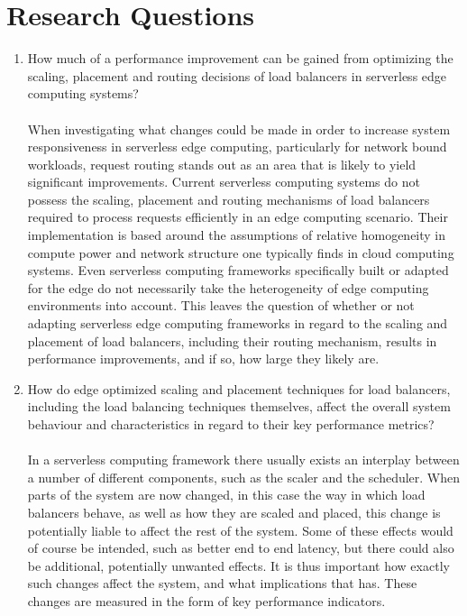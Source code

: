 \section{Research Questions}

\begin{enumerate}
    \item How much of a performance improvement can be gained from optimizing the scaling, placement and routing decisions of load balancers in serverless edge computing systems?\\\\
    When investigating what changes could be made in order to increase system responsiveness in serverless edge computing, particularly for network bound workloads, request routing stands out as an area that is likely to yield significant improvements. Current serverless computing systems do not possess the scaling, placement and routing mechanisms of load balancers required to process requests efficiently in an edge computing scenario. Their implementation is based around the assumptions of relative homogeneity in compute power and network structure one typically finds in cloud computing systems. Even serverless computing frameworks specifically built or adapted for the edge do not necessarily take the heterogeneity of edge computing environments into account. %
    This leaves the question of whether or not adapting serverless edge computing frameworks in regard to the scaling and placement of load balancers, including their routing mechanism, results in performance improvements, and if so, how large they likely are.
    
    \item How do edge optimized scaling and placement techniques for load balancers, including the load balancing techniques themselves, affect the overall system behaviour and characteristics in regard to their key performance metrics?\\\\
    In a serverless computing framework there usually exists an interplay between a number of different components, such as the scaler and the scheduler\cite{openfaas}\cite{kubernetes}. %
    When parts of the system are now changed, in this case the way in which load balancers behave, as well as how they are scaled and placed, this change is potentially liable to affect the rest of the system. Some of these effects would of course be intended, such as better end to end latency, but there could also be additional, potentially unwanted effects. It is thus important how exactly such changes affect the system, and what implications that has. These changes are measured in the form of key performance indicators.
    

\end{enumerate}

